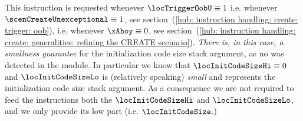 \begin{description}
		\saNote{}
		This \oobMod{} instruction is requested
		whenever $\locTriggerOobU           \equiv 1$
		i.e. whenever $\scenCreateUnexceptional  \equiv 1$, see section~(\ref{hub: instruction handling: create: trigger: oob}),
		i.e. whenever $\xAhoy                    \equiv 0$, see section~(\ref{hub: instruction handling: create: generalities: refining the CREATE scenario}).
		\emph{There is, in this case, a smallness guarantee} for the initialization code size stack argument,
		as no \mxpxSH{} was detected in the \mxpMod{} module.
		In particular we know that
		$\locInitCodeSizeHi \equiv 0$ and
		$\locInitCodeSizeLo$ is (relatively speaking) \emph{small} and represents the initialization code size stack argument.
		As a consequence we are not required to feed the \oobMod{} instructions both the
		$\locInitCodeSizeHi$ and $\locInitCodeSizeLo$,
		and we only provide its low part (i.e. $\locInitCodeSize$.)


\end{description}
